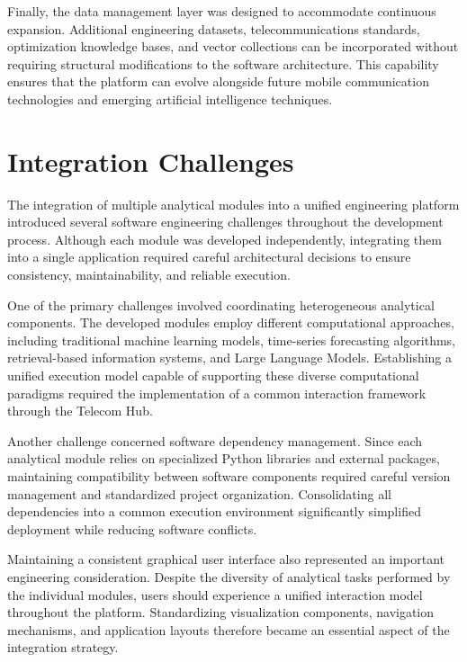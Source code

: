Finally, the data management layer was designed to accommodate continuous expansion. Additional engineering datasets, telecommunications standards, optimization knowledge bases, and vector collections can be incorporated without requiring structural modifications to the software architecture. This capability ensures that the platform can evolve alongside future mobile communication technologies and emerging artificial intelligence techniques.

\section{Integration Challenges}

The integration of multiple analytical modules into a unified engineering platform introduced several software engineering challenges throughout the development process. Although each module was developed independently, integrating them into a single application required careful architectural decisions to ensure consistency, maintainability, and reliable execution.

One of the primary challenges involved coordinating heterogeneous analytical components. The developed modules employ different computational approaches, including traditional machine learning models, time-series forecasting algorithms, retrieval-based information systems, and Large Language Models. Establishing a unified execution model capable of supporting these diverse computational paradigms required the implementation of a common interaction framework through the Telecom Hub.

Another challenge concerned software dependency management. Since each analytical module relies on specialized Python libraries and external packages, maintaining compatibility between software components required careful version management and standardized project organization. Consolidating all dependencies into a common execution environment significantly simplified deployment while reducing software conflicts.

Maintaining a consistent graphical user interface also represented an important engineering consideration. Despite the diversity of analytical tasks performed by the individual modules, users should experience a unified interaction model throughout the platform. Standardizing visualization components, navigation mechanisms, and application layouts therefore became an essential aspect of the integration strategy.

